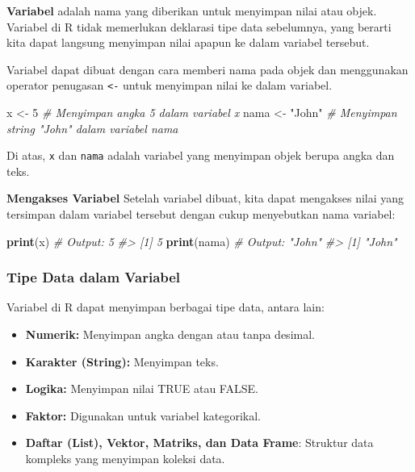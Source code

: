 \documentclass[
  oneside]{book}
\newenvironment{Shaded}{\begin{snugshade}}{\end{snugshade}}
\newcommand{\CommentTok}[1]{\textcolor[rgb]{0.56,0.35,0.01}{\textit{#1}}}
\newcommand{\DecValTok}[1]{\textcolor[rgb]{0.00,0.00,0.81}{#1}}
\newcommand{\FunctionTok}[1]{\textcolor[rgb]{0.13,0.29,0.53}{\textbf{#1}}}
\newcommand{\NormalTok}[1]{#1}
\newcommand{\OtherTok}[1]{\textcolor[rgb]{0.56,0.35,0.01}{#1}}
\newcommand{\StringTok}[1]{\textcolor[rgb]{0.31,0.60,0.02}{#1}}
\begin{document}
\textbf{Variabel} adalah nama yang diberikan untuk menyimpan nilai atau
objek. Variabel di R tidak memerlukan deklarasi tipe data sebelumnya,
yang berarti kita dapat langsung menyimpan nilai apapun ke dalam
variabel tersebut.

Variabel dapat dibuat dengan cara memberi nama pada objek dan
menggunakan operator penugasan \texttt{\textless{}-} untuk menyimpan nilai ke dalam
variabel.

\begin{Shaded}
\begin{Highlighting}[]
\NormalTok{x }\OtherTok{\textless{}{-}} \DecValTok{5}      \CommentTok{\# Menyimpan angka 5 dalam variabel x}
\NormalTok{nama }\OtherTok{\textless{}{-}} \StringTok{"John"}  \CommentTok{\# Menyimpan string "John" dalam variabel nama}
\end{Highlighting}
\end{Shaded}

Di atas, \texttt{x} dan \texttt{nama} adalah variabel yang menyimpan objek berupa
angka dan teks.

\textbf{Mengakses Variabel} Setelah variabel dibuat, kita dapat mengakses
nilai yang tersimpan dalam variabel tersebut dengan cukup menyebutkan
nama variabel:

\begin{Shaded}
\begin{Highlighting}[]
\FunctionTok{print}\NormalTok{(x)    }\CommentTok{\# Output: 5}
\CommentTok{\#\textgreater{} [1] 5}
\FunctionTok{print}\NormalTok{(nama) }\CommentTok{\# Output: "John"}
\CommentTok{\#\textgreater{} [1] "John"}
\end{Highlighting}
\end{Shaded}

\subsubsection*{Tipe Data dalam Variabel}\label{tipe-data-dalam-variabel}

Variabel di R dapat menyimpan berbagai tipe data, antara lain:

\begin{itemize}
\item
  \textbf{Numerik:} Menyimpan angka dengan atau tanpa desimal.
\item
  \textbf{Karakter (String):} Menyimpan teks.
\item
  \textbf{Logika:} Menyimpan nilai TRUE atau FALSE.
\item
  \textbf{Faktor:} Digunakan untuk variabel kategorikal.
\item
  \textbf{Daftar (List), Vektor, Matriks, dan Data Frame}: Struktur data
  kompleks yang menyimpan koleksi data.
\end{itemize}
\end{document}
